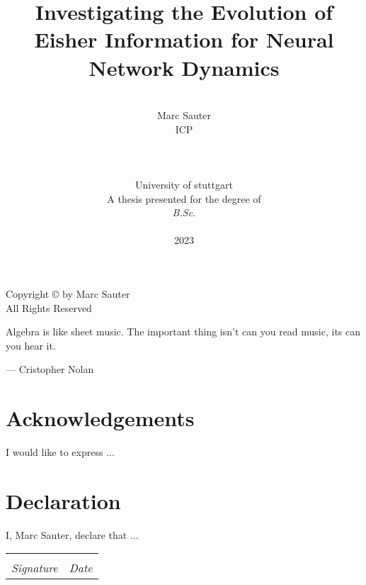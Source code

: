 \documentclass[12pt, a4paper]{report}
\date{}
\title{Investigating the Evolution of Eisher Information for Neural Network Dynamics}
\author{\\ \Large{Marc Sauter}
	\\ ICP
	\\
	\\
	\\
	\\ University of stuttgart
	\\
	A thesis presented for the degree of \\ \textit{B.Sc.}
	\\ \\
	2023
}
\begin{document}
	\thispagestyle{headings}
	\maketitle
	\FloatBarrier
	
	\newpage
	\thispagestyle{empty}
	\vspace*{\fill}
	\begin{center}
		Copyright \copyright  {} by Marc Sauter \\ All Rights Reserved
	\end{center}
	\vspace*{\fill}
	\newpage
	\thispagestyle{empty}
	\epigraph{Algebra is like sheet music. The important thing isn't can you read music, its can you hear it.}{--- \textup{Cristopher Nolan}}
	
	\thispagestyle{empty}
	\chapter*{Acknowledgements}
	I would like to express ...
	
	
	\thispagestyle{empty}
	\chapter*{Declaration}
	I, Marc Sauter, declare that ...
	
	\vspace{3cm}
	\noindent\begin{tabular}{ll}
		\makebox[2.5in]{\hrulefill} & \makebox[2.5in]{\hrulefill}\\
		\textit{Signature} & \textit{Date}\\
	\end{tabular}
	
	\thispagestyle{empty}
	\begin{abstract}
		\lipsum[1-2]
		
	\end{abstract}
	\tableofcontents
	\thispagestyle{plain}
	\listoffigures
	\listoftables
	
\end{document}
